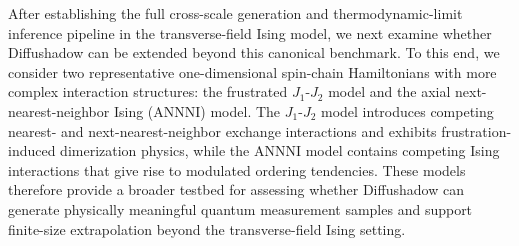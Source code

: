 \documentclass[pdflatex,sn-mathphys-num]{sn-jnl}%
\theoremstyle{thmstyleone}%
\theoremstyle{thmstyletwo}%
\theoremstyle{thmstylethree}%
\begin{document}




After establishing the full cross-scale generation and thermodynamic-limit inference pipeline in the transverse-field Ising model, we next examine whether Diffushadow can be extended beyond this canonical benchmark. To this end, we consider two representative one-dimensional spin-chain Hamiltonians with more complex interaction structures: the frustrated \(J_1\)-\(J_2\) model and the axial next-nearest-neighbor Ising (ANNNI) model. The \(J_1\)-\(J_2\) model introduces competing nearest- and next-nearest-neighbor exchange interactions and exhibits frustration-induced dimerization physics, while the ANNNI model contains competing Ising interactions that give rise to modulated ordering tendencies. These models therefore provide a broader testbed for assessing whether Diffushadow can generate physically meaningful quantum measurement samples and support finite-size extrapolation beyond the transverse-field Ising setting.
\end{document}
